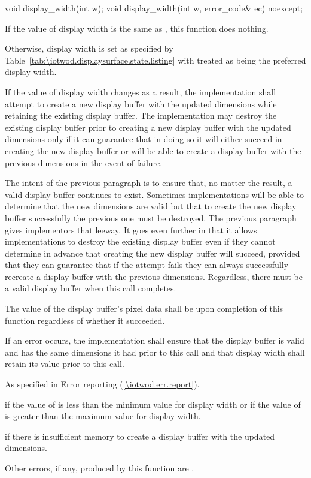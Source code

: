 \begin{itemdecl}
void display_width(int w);
void display_width(int w, error_code& ec) noexcept;
\end{itemdecl}
\begin{itemdescr}
\pnum
\effects
If the value of display width is the same as , this function does nothing.

\pnum
Otherwise, display width is set as specified by Table~\ref{tab:\iotwod.displaysurface.state.listing} with  treated as being the preferred display width.

\pnum
If the value of display width changes as a result, the implementation shall attempt to create a new display buffer with the updated dimensions while retaining the existing display buffer. The implementation may destroy the existing display buffer prior to creating a new display buffer with the updated dimensions only if it can guarantee that in doing so it will either succeed in creating the new display buffer or will be able to create a display buffer with the previous dimensions in the event of failure.

\pnum
\begin{note}
The intent of the previous paragraph is to ensure that, no matter the result, a valid display buffer continues to exist. Sometimes implementations will be able to determine that the new dimensions are valid but that to create the new display buffer successfully the previous one must be destroyed. The previous paragraph gives implementors that leeway. It goes even further in that it allows implementations to destroy the existing display buffer even if they cannot determine in advance that creating the new display buffer will succeed, provided that they can guarantee that if the attempt fails they can always successfully recreate a display buffer with the previous dimensions. Regardless, there must be a valid display buffer when this call completes.
\end{note}

\pnum
The value of the display buffer's pixel data shall be \unspecnorm upon completion of this function regardless of whether it succeeded.

\pnum
If an error occurs, the implementation shall ensure that the display buffer is valid and has the same dimensions it had prior to this call and that display width shall retain its value prior to this call.

\pnum
\throws
As specified in Error reporting (\ref{\iotwod.err.report}).

\pnum
\errors
{} if the value of  is less than the minimum value for display width or if the value of  is greater than the maximum value for display width.

 if there is insufficient memory to create a display buffer with the updated dimensions.

Other errors, if any, produced by this function are .
\end{itemdescr}

